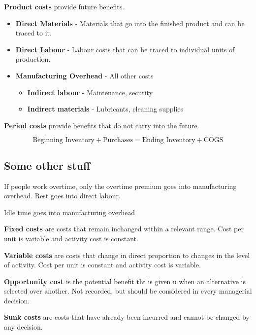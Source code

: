 \documentclass[english, 12pt]{article}
\begin{document}
\begin{defn}
\textbf{Product costs} provide future benefits.
\begin{itemize}
\item \textbf{Direct Materials} - Materials that go into the finished product and can be traced to it.
\item \textbf{Direct Labour} - Labour costs that can be traced to individual units of production.
\item \textbf{Manufacturing Overhead} - All other costs
\begin{itemize}
\item \textbf{Indirect labour} - Maintenance, security
\item \textbf{Indirect materials} - Lubricants, cleaning supplies
\end{itemize}
\end{itemize}
\end{defn}
\begin{defn}
\textbf{Period costs} provide benefits that do not carry into the future.
\end{defn}
\[ \text{Beginning Inventory} + \text{Purchases} = \text{Ending Inventory} + \text{COGS}\]


\subsection{Some other stuff}
If people work overtime, only the overtime premium goes into manufacturing overhead. Rest goes into direct labour.
\begin{note}
Idle time goes into manufacturing overhead
\end{note}
\begin{defn}
\textbf{Fixed costs} are costs that remain inchanged within a relevant range. Cost per unit is variable and activity cost is constant.
\end{defn}


\begin{defn}
\textbf{Variable costs} are  costs that change in direct proportion to changes in the level of activity. Cost per unit is constant and activity cost is variable.
\end{defn}

\begin{defn}
\textbf{Opportunity cost} is the potential benefit tht is given u when an alternative is selected over another. Not recorded, but should be considered in every managerial decision.
\end{defn}

\begin{defn}
\textbf{Sunk costs} are costs that have already been incurred and cannot be changed by any decision.
\end{defn}
\end{document}
